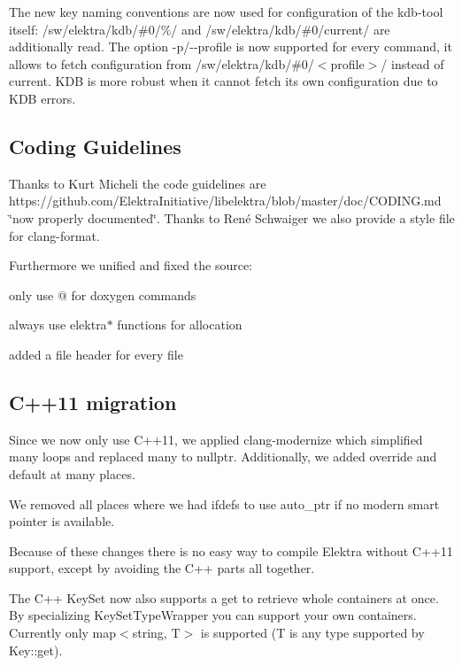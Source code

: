 The new key naming conventions are now used for configuration of the {\ttfamily kdb}-\/tool itself\+: {\ttfamily /sw/elektra/kdb/\#0/\%/} and {\ttfamily /sw/elektra/kdb/\#0/current/} are additionally read. The option {\ttfamily -\/p}/{\ttfamily -\/-\/profile} is now supported for every command, it allows to fetch configuration from {\ttfamily /sw/elektra/kdb/\#0/$<$profile$>$/} instead of {\ttfamily current}. K\+DB is more robust when it cannot fetch its own configuration due to K\+DB errors.

\subsection*{Coding Guidelines}

Thanks to Kurt Micheli the code guidelines are https\+://github.com/\+Elektra\+Initiative/libelektra/blob/master/doc/\+C\+O\+D\+I\+N\+G.\+md \char`\"{}now properly documented\char`\"{}. Thanks to René Schwaiger we also provide a style file for clang-\/format.

Furthermore we unified and fixed the source\+:
\begin{DoxyItemize}
\item only use @ for doxygen commands
\item always use elektra$\ast$ functions for allocation
\item added a file header for every file
\end{DoxyItemize}

\subsection*{C++11 migration}

Since we now only use C++11, we applied {\ttfamily clang-\/modernize} which simplified many loops and replaced many {} to {\ttfamily nullptr}. Additionally, we added {\ttfamily override} and {\ttfamily default} at many places.

We removed all places where we had {\ttfamily ifdefs} to use {\ttfamily auto\+\_\+ptr} if no modern smart pointer is available.

Because of these changes there is no easy way to compile Elektra without C++11 support, except by avoiding the C++ parts all together.

The C++ {\ttfamily Key\+Set} now also supports a {\ttfamily get} to retrieve whole containers at once. By specializing {\ttfamily Key\+Set\+Type\+Wrapper} you can support your own containers. Currently only {\ttfamily map$<$string, T$>$} is supported (T is any type supported by {\ttfamily Key\+::get}).

